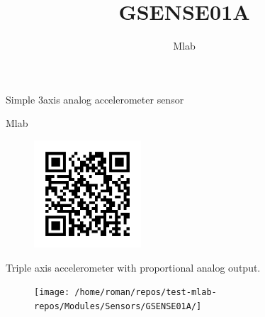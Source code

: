 \documentclass[12pt,a4paper]{article}
\author{ Mlab }
\title{ GSENSE01A }
\begin{document}
\fontsize{14.4}{20}\selectfont

\vspace*{\fill}

\begin{center}
{\Huge 
Simple 3axis analog accelerometer sensor
}

{\Large Mlab}

\vspace*{\fill}
\vspace*{1cm}

\end{center}

\begin{figure}
    \includegraphics[width=4cm]{DOC/SRC/img/GSENSE01A_QRcode.png}
\end{figure}

Triple axis accelerometer with proportional analog output.


\vspace*{\fill}
\vfill
\vspace*{1cm}

\begin{figure}[ht!]
\centering
\texttt{[image: /home/roman/repos/test-mlab-repos/Modules/Sensors/GSENSE01A/]} 
\end{figure}





\newpage



\end{document}
